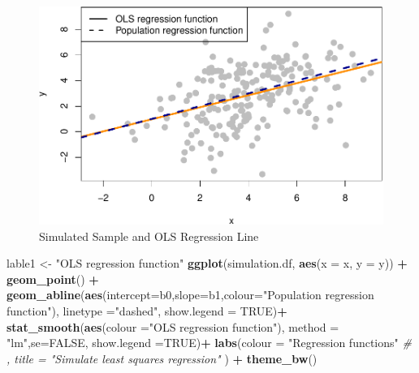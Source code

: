 \documentclass[]{book}
\newenvironment{Shaded}{\begin{snugshade}}{\end{snugshade}}
\newcommand{\CommentTok}[1]{\textcolor[rgb]{0.56,0.35,0.01}{\textit{#1}}}
\newcommand{\DataTypeTok}[1]{\textcolor[rgb]{0.13,0.29,0.53}{#1}}
\newcommand{\KeywordTok}[1]{\textcolor[rgb]{0.13,0.29,0.53}{\textbf{#1}}}
\newcommand{\NormalTok}[1]{#1}
\newcommand{\OperatorTok}[1]{\textcolor[rgb]{0.81,0.36,0.00}{\textbf{#1}}}
\newcommand{\OtherTok}[1]{\textcolor[rgb]{0.56,0.35,0.01}{#1}}
\newcommand{\StringTok}[1]{\textcolor[rgb]{0.31,0.60,0.02}{#1}}
\begin{document}
\begin{figure}

{\centering \includegraphics[width=0.8\linewidth]{MEM5220_R_files/figure-latex/fig5-1} 

}

\caption{Simulated Sample and OLS Regression Line}\label{fig:fig5}
\end{figure}

\begin{Shaded}
\begin{Highlighting}[]
\NormalTok{lable1 <-}\StringTok{ "OLS regression function"}
\KeywordTok{ggplot}\NormalTok{(simulation.df, }\KeywordTok{aes}\NormalTok{(}\DataTypeTok{x =}\NormalTok{ x,  }\DataTypeTok{y =}\NormalTok{ y)) }\OperatorTok{+}
\StringTok{  }\KeywordTok{geom_point}\NormalTok{() }\OperatorTok{+}
\StringTok{  }\KeywordTok{geom_abline}\NormalTok{(}\KeywordTok{aes}\NormalTok{(}\DataTypeTok{intercept=}\NormalTok{b0,}\DataTypeTok{slope=}\NormalTok{b1,}\DataTypeTok{colour=}\StringTok{"Population regression function"}\NormalTok{), }\DataTypeTok{linetype =}\StringTok{"dashed"}\NormalTok{, }\DataTypeTok{show.legend  =} \OtherTok{TRUE}\NormalTok{)}\OperatorTok{+}
\StringTok{  }\KeywordTok{stat_smooth}\NormalTok{(}\KeywordTok{aes}\NormalTok{(}\DataTypeTok{colour =}\StringTok{"OLS regression function"}\NormalTok{), }\DataTypeTok{method =} \StringTok{"lm"}\NormalTok{,}\DataTypeTok{se=}\OtherTok{FALSE}\NormalTok{, }\DataTypeTok{show.legend =}\OtherTok{TRUE}\NormalTok{)}\OperatorTok{+}
\StringTok{  }\KeywordTok{labs}\NormalTok{(}\DataTypeTok{colour =} \StringTok{"Regression functions"} 
       \CommentTok{# , title = "Simulate least squares regression"}
\NormalTok{       ) }\OperatorTok{+}
\StringTok{  }\KeywordTok{theme_bw}\NormalTok{()}
\end{Highlighting}
\end{Shaded}
\end{document}
